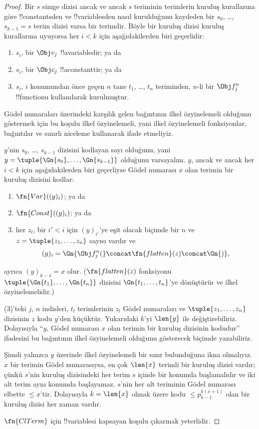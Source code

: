 \begin{proof}
Bir $s$ simge dizisi ancak ve ancak $s$ teriminin terimlerin kuruluş
kurallarına göre !!{constant}s{}den ve !!{variable}s{}den nasıl kurulduğunu
kaydeden bir $s_0$, \dots, $s_{k-1}=s$ terim dizisi varsa bir terimdir.
Böyle bir kuruluş dizisi kuruluş kurallarına uyuyorsa her $i<k$ için
aşağıdakilerden biri geçerlidir:
\begin{enumerate}
\item $s_i$, bir $\Obj v_j$ !!a{variable}{}dir; ya da
\item $s_i$, bir $\Obj c_j$ !!a{constant}{}tir; ya da
\item $s_i$, $i$ konumundan önce geçen $n$ tane $t_1$, \dots, $t_n$
  teriminden, $n$-li bir $\Obj f^n_j$ !!{function}{}u kullanılarak kurulmuştur.
\end{enumerate}
Gödel numaraları üzerindeki karşılık gelen bağıntının ilkel özyinelemeli
olduğunu göstermek için bu koşulu ilkel özyinelemeli, yani ilkel özyinelemeli
fonksiyonlar, bağıntılar ve sınırlı niceleme kullanarak ifade etmeliyiz.

$y$'nin $s_0$, \dots, $s_{k-1}$ dizisini kodlayan sayı olduğunu, yani
$y=\tuple{\Gn{s_0},\dots,\Gn{s_{k-1}}}$ olduğunu varsayalım. $y$, ancak ve
ancak her $i<k$ için aşağıdakilerden biri geçerliyse Gödel numarası $x$ olan
terimin bir kuruluş dizisini kodlar:
\begin{enumerate}
\item $\fn{Var}((y)_i)$; ya da
\item $\fn{Const}((y)_i)$; ya da
\item her $z_l$, bir $i'<i$ için $(y)_{i'}$'ye eşit olacak biçimde bir $n$
  ve $z=\tuple{z_1,\dots,z_n}$ sayısı vardır ve
\[
(y)_i = \Gn{\Obj f^n_j(} \concat \fn{flatten}(z) \concat \Gn{)},
\]
\end{enumerate}
ayrıca $(y)_{k-1}=x$ olur. ($\fn{flatten}(z)$ fonksiyonu
$\tuple{\Gn{t_1},\dots,\Gn{t_n}}$ dizisini $\Gn{t_1,\dots,t_n}$'ye
dönüştürür ve ilkel özyinelemelidir.)

(3)'teki $j$, $n$ indisleri, $t_l$ terimlerinin $z_l$ Gödel numaraları ve
$\tuple{z_1,\dots,z_n}$ dizisinin $z$ kodu $y$'den küçüktür. Yukarıdaki
$k$'yi $\len{y}$ ile değiştirebiliriz. Dolayısıyla ``$y$, Gödel numarası $x$
olan terimin bir kuruluş dizisinin kodudur'' ifadesini bu bağıntının ilkel
özyinelemeli olduğunu gösterecek biçimde yazabiliriz.

Şimdi yalnızca $y$ üzerinde ilkel özyinelemeli bir sınır bulunduğuna ikna
olmalıyız. $x$ bir terimin Gödel numarasıysa, en çok $\len{x}$ terimli bir
kuruluş dizisi vardır; çünkü $s$'nin kuruluş dizisindeki her terim $s$
içinde bir konumda başlamalıdır ve iki alt terim aynı konumda başlayamaz.
$s$'nin her alt teriminin Gödel numarası elbette $\le x$'tir. Dolayısıyla
$k=\len{x}$ olmak üzere kodu $\le p_{k-1}^{k(x+1)}$ olan bir kuruluş dizisi
her zaman vardır.

$\fn{ClTerm}$ için !!{variable}s{}i kapsayan koşulu çıkarmak yeterlidir.
\end{proof}


